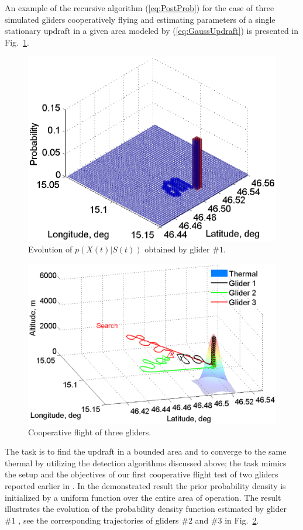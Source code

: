 \documentclass{ifacconf}
\newcommand{\squeezeup}{\vspace{-3.0mm}}
\begin{document}
An example of the recursive algorithm (\ref{eq:PostProb}) for the case of
three simulated gliders cooperatively flying and estimating parameters of a
single stationary updraft in a given area modeled by (\ref{eq:GaussUpdraft})
is presented in Fig.~\ref{fig:SimPDF}.
\begin{figure}[thpb]
  \centering
  \includegraphics[scale=0.51]{Figures/Mapping_thermals_2.eps}
  \caption{Evolution of $p(X(t)\vert S(t))$ obtained by glider $\#1$.}
  \label{fig:SimPDF}
\end{figure}
\begin{figure}[thp]
  \centering
  \includegraphics[scale=0.41]{Figures/paths_cooperative_flight_2.eps}
  \caption{Cooperative flight of three gliders.}
  \label{fig:CoopFlightPaths}
\end{figure}
The task is to find the updraft in a bounded area and to converge to the same
thermal by utilizing the detection algorithms discussed above; the task
mimics the setup and the objectives of our first cooperative flight test of
two gliders reported earlier in \cite{AKlass_JGCD:2012}. In the demonstrated
result the prior probability density is initialized by a uniform function
over the entire area of operation. The result illustrates the evolution of
the probability density function estimated by glider $\#1$ , see the corresponding trajectories of gliders $\#2$
and $\#3$ in Fig.~\ref{fig:CoopFlightPaths}.
\end{document}
